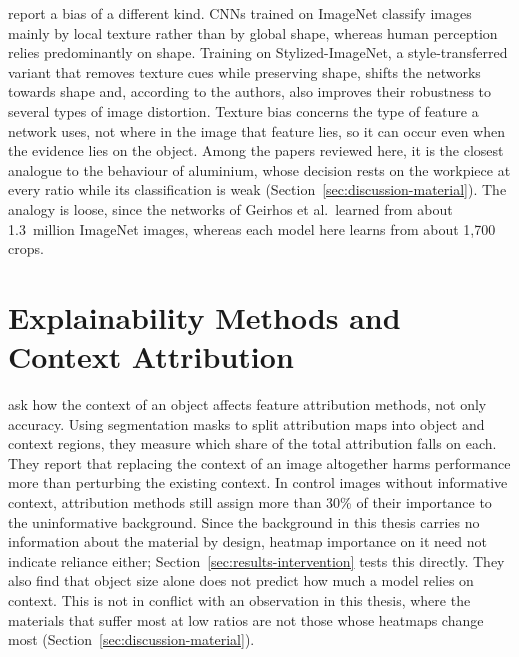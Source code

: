 \citet{geirhos2019texture} report a bias of a different kind. CNNs trained
on ImageNet classify images mainly by local texture rather than by global shape, whereas
human perception relies predominantly on shape. Training on Stylized-ImageNet, a
style-transferred variant that removes texture cues while preserving shape, shifts the
networks towards shape and, according to the authors, also improves their robustness to
several types of image distortion. Texture bias concerns the type of feature a network
uses, not where in the image that feature lies, so it can occur even when the evidence
lies on the object. Among the papers reviewed here, it is the closest analogue to the
behaviour of aluminium, whose decision rests on the workpiece at every ratio while its
classification is weak (Section~\ref{sec:discussion-material}). The analogy
is loose, since the networks of Geirhos et al.\ learned from about 1.3~million ImageNet
images, whereas each model here learns from about 1,700 crops.

\section{Explainability Methods and Context Attribution}
\label{sec:related-work-explainability}

\citet{adhikari2024lostincontext} ask how the context of an object
affects feature attribution methods, not only accuracy. Using segmentation masks to
split attribution maps into object and context regions, they measure which share of the
total attribution falls on each. They report that replacing the context of
an image altogether harms performance more than perturbing the existing context. In control images without
informative context, attribution methods still assign more than 30\% of their importance
to the uninformative background. Since the background in this thesis carries no
information about the material by design, heatmap importance on it need not indicate
reliance either; Section~\ref{sec:results-intervention} tests this directly. They also
find that object size alone does not predict
how much a model relies on context. This is not in conflict with an observation in this
thesis, where the materials that suffer most at low ratios are not those whose heatmaps
change most (Section~\ref{sec:discussion-material}).

